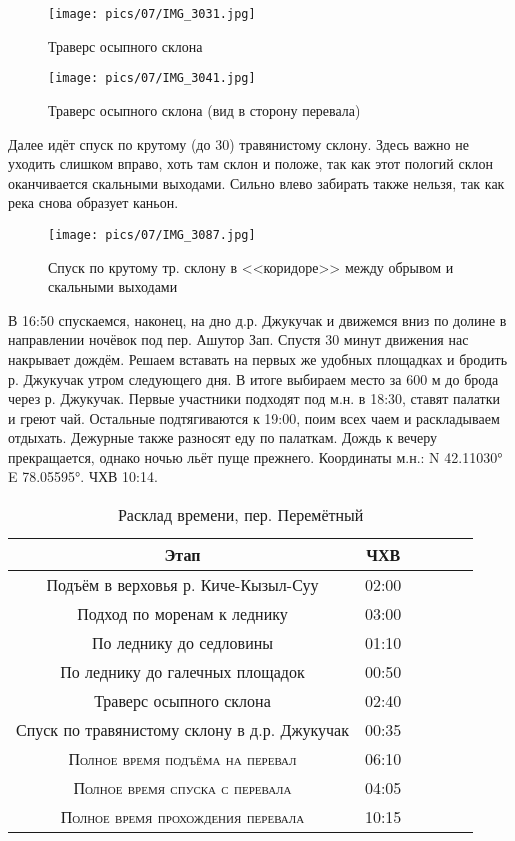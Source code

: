 \begin{figure}[h!]
	\centering
	\texttt{[image: pics/07/IMG\_3031.jpg]}
	\caption{Траверс осыпного склона}
	\label{fig:IMG_3031.jpg}
\end{figure}

\begin{figure}[h!]
	\centering
	\texttt{[image: pics/07/IMG\_3041.jpg]}
	\caption{Траверс осыпного склона (вид в сторону перевала)}
	\label{fig:IMG_3041.jpg}
\end{figure}

Далее идёт спуск по крутому (до 30\degree) травянистому склону. Здесь важно не уходить слишком вправо, хоть там склон и положе, так как этот пологий склон оканчивается скальными выходами. Сильно влево забирать также нельзя, так как река снова образует каньон.

\begin{figure}[h!]
	\centering	\texttt{[image: pics/07/IMG\_3087.jpg]}
	\caption{Спуск по крутому тр. склону в <<коридоре>> между обрывом и скальными  выходами}
	\label{fig:IMG_3087.jpg}
\end{figure}


В 16:50 спускаемся, наконец, на дно д.р. Джукучак и движемся вниз по долине в направлении ночёвок под пер. Ашутор Зап. Спустя 30 минут движения нас накрывает дождём. Решаем вставать на первых же удобных площадках и бродить р. Джукучак утром следующего дня. В итоге выбираем место за 600 м до брода через р. Джукучак. Первые участники подходят под м.н. в 18:30, ставят палатки и греют чай. Остальные подтягиваются к 19:00, поим всех чаем и раскладываем отдыхать. Дежурные также разносят еду по палаткам. Дождь к вечеру прекращается, однако ночью льёт пуще прежнего.
Координаты м.н.: N 42.11030° E 78.05595°. ЧХВ 10:14.

\begin{table}[h!]
	\centering
	\begin{tabular}{|c|c|c|c|c|c|} 
		\hline 
		Этап & ЧХВ \\ 	
		\hline 
		Подъём в верховья р. Киче-Кызыл-Суу  & 02:00 \\
		Подход по моренам к леднику  & 03:00 \\
		По леднику до седловины & 01:10\\ 
		По леднику до галечных площадок & 00:50\\ 
		Траверс осыпного склона & 02:40\\ 
		Спуск по травянистому склону в д.р. Джукучак & 00:35 \\
		\hline
		\textsc{Полное время подъёма на перевал  }& 06:10\\
		\textsc{Полное время спуска с перевала }& 04:05 \\
		\textsc{	Полное время прохождения перевала }& 10:15 \\
		\hline
	\end{tabular}
	\caption{Расклад времени, пер. Перемётный}
\end{table}




